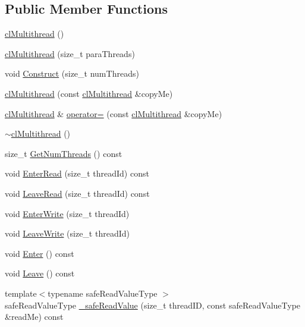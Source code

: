 \subsection*{Public Member Functions}
\begin{DoxyCompactItemize}
\item 
\hyperlink{classcl_multithread_a0368e3aaa02c48b2b847c2df57bfedf9}{clMultithread} ()
\item 
\hyperlink{classcl_multithread_a78f91b5da95e35c22f116665c07f1463}{clMultithread} (size\_\-t paraThreads)
\item 
void \hyperlink{classcl_multithread_a802145078ef91eb1c59adb652989a1fd}{Construct} (size\_\-t numThreads)
\item 
\hyperlink{classcl_multithread_a9cf60865be0046480e60a54aacfaedac}{clMultithread} (const \hyperlink{classcl_multithread}{clMultithread} \&copyMe)
\item 
\hyperlink{classcl_multithread}{clMultithread} \& \hyperlink{classcl_multithread_a70557b608934eae0d25b72cd5a73c8b7}{operator=} (const \hyperlink{classcl_multithread}{clMultithread} \&copyMe)
\item 
\hyperlink{classcl_multithread_a9812bf3facacdb02b5492214742ff18b}{$\sim$clMultithread} ()
\item 
size\_\-t \hyperlink{classcl_multithread_a789162b14cd4bd6d441836c5c9979267}{GetNumThreads} () const 
\item 
void \hyperlink{classcl_multithread_a6f730369b70f5556f80d4d15be37338f}{EnterRead} (size\_\-t threadId) const 
\item 
void \hyperlink{classcl_multithread_a5fbf02705063fe557cda02f908d9861d}{LeaveRead} (size\_\-t threadId) const 
\item 
void \hyperlink{classcl_multithread_a4885f5f32b369f3ebc6dc2d2aa07a513}{EnterWrite} (size\_\-t threadId)
\item 
void \hyperlink{classcl_multithread_ab78d6bfc68a8a5bddc7d10cf30781185}{LeaveWrite} (size\_\-t threadId)
\item 
void \hyperlink{classcl_multithread_abdf5c107039fcf657847f011810a3fb1}{Enter} () const 
\item 
void \hyperlink{classcl_multithread_aaab46d6187878165f8da6e67999d4218}{Leave} () const 
\item 
{\footnotesize template$<$typename safeReadValueType $>$ }\\safeReadValueType \hyperlink{classcl_multithread_a1cffdc6c8c6e3789467320e2e5131123}{\_\-safeReadValue} (size\_\-t threadID, const safeReadValueType \&readMe) const 

\end{DoxyCompactItemize}
